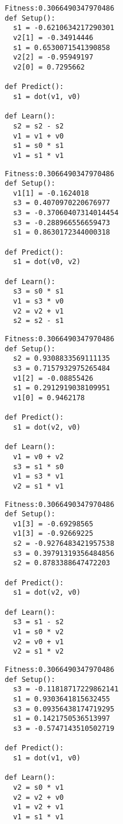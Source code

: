 \documentclass[twocolumn, a4j]{jarticle}
\begin{document}
\newpage

\begin{lstlisting}[caption= No. 0.11]
Fitness:0.3066490347970486 
def Setup():
  s1 = -0.6210634217290301
  v2[1] = -0.34914446
  s1 = 0.6530071541390858
  v2[2] = -0.95949197
  v2[0] = 0.7295662

def Predict():
  s1 = dot(v1, v0)

def Learn():
  s2 = s2 - s2
  v1 = v1 + v0
  s1 = s0 * s1
  v1 = s1 * v1

\end{lstlisting}

\begin{lstlisting}[caption= No. 0.12]
Fitness:0.3066490347970486 
def Setup():
  v1[1] = -0.1624018
  s3 = 0.4070970220676977
  s3 = -0.37060407314014454
  s3 = -0.288966556659473
  s1 = 0.8630172344000318

def Predict():
  s1 = dot(v0, v2)

def Learn():
  s3 = s0 * s1
  v1 = s3 * v0
  v2 = v2 + v1
  s2 = s2 - s1

\end{lstlisting}

\newpage

\begin{lstlisting}[caption= No. 0.13]
Fitness:0.3066490347970486 
def Setup():
  s2 = 0.9308833569111135
  s3 = 0.7157932975265484
  v1[2] = -0.08855426
  s1 = 0.2912919038109951
  v1[0] = 0.9462178

def Predict():
  s1 = dot(v2, v0)

def Learn():
  v1 = v0 + v2
  s3 = s1 * s0
  v1 = s3 * v1
  v2 = s1 * v1

\end{lstlisting}

\begin{lstlisting}[caption= No. 0.14]
Fitness:0.3066490347970486 
def Setup():
  v1[3] = -0.69298565
  v1[3] = -0.92669225
  s2 = -0.9276483421957538
  s3 = 0.39791319356484856
  s2 = 0.8783388647472203

def Predict():
  s1 = dot(v2, v0)

def Learn():
  s3 = s1 - s2
  v1 = s0 * v2
  v2 = v0 + v1
  v2 = s1 * v2

\end{lstlisting}

\newpage

\begin{lstlisting}[caption= No. 0.15]
Fitness:0.3066490347970486 
def Setup():
  s3 = -0.11818717229862141
  s1 = 0.9303641815632455
  s3 = 0.09356438174719295
  s1 = 0.1421750536513997
  s3 = -0.5747143510502719

def Predict():
  s1 = dot(v1, v0)

def Learn():
  v2 = s0 * v1
  v2 = v2 + v0
  v1 = v2 + v1
  v1 = s1 * v1

\end{lstlisting}
\end{document}
